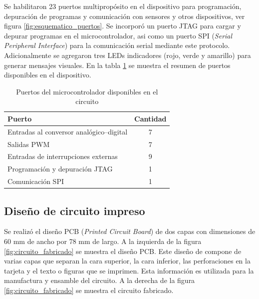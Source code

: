 Se habilitaron 23 puertos multipropósito en el dispositivo para programación, depuración de programas y comunicación con sensores y otros dispositivos, ver figura \ref{fig:esquematico_puertos}. Se incorporó un puerto JTAG para cargar y depurar programas en el microcontrolador, asi como un puerto SPI (\textit{Serial Peripheral Interface}) para la comunicación serial mediante este protocolo. Adicionalmente se agregaron tres LEDs indicadores (rojo, verde y amarillo) para generar mensajes visuales. En la tabla \ref{tabla:puertos} se muestra el resumen de puertos disponibles en el dispositivo. 

\begin{table}
	\begin{center}
		\caption{Puertos del microcontrolador disponibles en el circuito}
		\label{tabla:puertos}
		\small
		\begin{tabular}{l|c}
			\toprule
			\textbf{Puerto} & \textbf{Cantidad}\\
			\midrule
			Entradas al conversor analógico--digital & 7\\
			Salidas PWM & 7\\
			Entradas de interrupciones externas & 9\\
			Programación y depuración JTAG & 1\\
			Comunicación SPI & 1\\
			\bottomrule
		\end{tabular}
	\end{center}
\end{table}

\subsection{Diseño de circuito impreso}

Se realizó el diseño PCB (\textit{Printed Circuit Board}) de dos capas con dimensiones de 60 mm de ancho por 78 mm de largo. A la izquierda de la figura \ref{fig:circuito_fabricado} se muestra el diseño PCB. Este diseño de compone de varias capas que separan la cara superior, la cara inferior, las perforaciones en la tarjeta y el texto o figuras que se imprimen. Esta información es utilizada para la manufactura y ensamble del circuito. A la derecha de la figura \ref{fig:circuito_fabricado} se muestra el circuito fabricado. 

